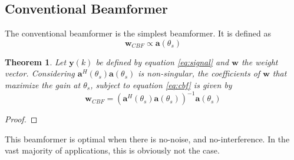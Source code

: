 \documentclass[12pt]{article}
\newtheorem{theorem}{Theorem}
\begin{document}
\subsection{Conventional Beamformer}
The conventional beamformer is the simplest beamformer. It is defined as
\begin{equation}\label{eq:cbf}
   \mathbf{w}_{CBF} \propto \mathbf{a}(\theta_s)
\end{equation}
\begin{theorem}
    Let $\mathbf{y}(k)$ be defined by equation \ref{eq:signal} and $\mathbf{w}$ the weight vector. Considering $\mathbf{a}^H(\theta_s)\mathbf{a}(\theta_s)$ is non-singular, the coefficients of $\mathbf{w}$ that maximize the gain at $\theta_s$, subject to equation \ref{eq:cbf} is given by
    \begin{equation}
        \mathbf{w}_{CBF} = \left(\mathbf{a}^H(\theta_s)\mathbf{a}(\theta_s)\right)^{-1}\mathbf{a}(\theta_s)
    \end{equation}
\end{theorem}
\begin{proof}

\end{proof}
This beamformer is optimal when there is no-noise, and no-interference. In the vast majority of applications, this is obviously not the case. 
\end{document}
